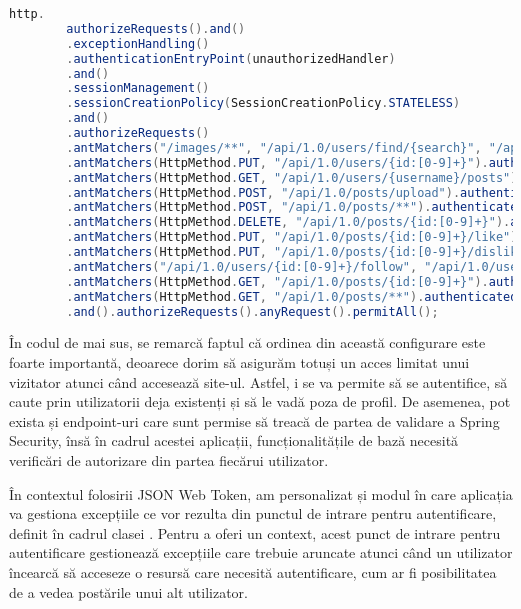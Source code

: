 \begin{lstlisting}[language=Java]
	http.
		authorizeRequests().and()
		.exceptionHandling()
		.authenticationEntryPoint(unauthorizedHandler)
		.and()
		.sessionManagement()
		.sessionCreationPolicy(SessionCreationPolicy.STATELESS)
		.and()
		.authorizeRequests()
		.antMatchers("/images/**", "/api/1.0/users/find/{search}", "/api/1.0/auth/**").permitAll()
		.antMatchers(HttpMethod.PUT, "/api/1.0/users/{id:[0-9]+}").authenticated()
		.antMatchers(HttpMethod.GET, "/api/1.0/users/{username}/posts").authenticated()
		.antMatchers(HttpMethod.POST, "/api/1.0/posts/upload").authenticated()
		.antMatchers(HttpMethod.POST, "/api/1.0/posts/**").authenticated()
		.antMatchers(HttpMethod.DELETE, "/api/1.0/posts/{id:[0-9]+}").authenticated()
		.antMatchers(HttpMethod.PUT, "/api/1.0/posts/{id:[0-9]+}/like").authenticated()
		.antMatchers(HttpMethod.PUT, "/api/1.0/posts/{id:[0-9]+}/dislike").authenticated()
		.antMatchers("/api/1.0/users/{id:[0-9]+}/follow", "/api/1.0/users/{id:[0-9]+}/unfollow").authenticated()
		.antMatchers(HttpMethod.GET, "/api/1.0/posts/{id:[0-9]+}").authenticated()
		.antMatchers(HttpMethod.GET, "/api/1.0/posts/**").authenticated()
		.and().authorizeRequests().anyRequest().permitAll();
\end{lstlisting}

În codul de mai sus, se remarcă faptul că ordinea din această configurare este foarte importantă, deoarece dorim să asigurăm totuși un acces limitat unui vizitator atunci când accesează site-ul. Astfel, i se va permite să se autentifice, să caute prin utilizatorii deja existenți și să le vadă poza de profil. De asemenea, pot exista și endpoint-uri care sunt permise să treacă de partea de validare a Spring Security, însă în cadrul acestei aplicații, funcționalitățile de bază necesită verificări de autorizare din partea fiecărui utilizator.\newline

În contextul folosirii JSON Web Token, am personalizat și modul în care aplicația va gestiona excepțiile ce vor rezulta din punctul de intrare pentru autentificare, definit în cadrul clasei . Pentru a oferi un context, acest punct de intrare pentru autentificare gestionează excepțiile care trebuie aruncate atunci când un utilizator încearcă să acceseze o resursă care necesită autentificare, cum ar fi posibilitatea de a vedea postările unui alt utilizator.\newline

